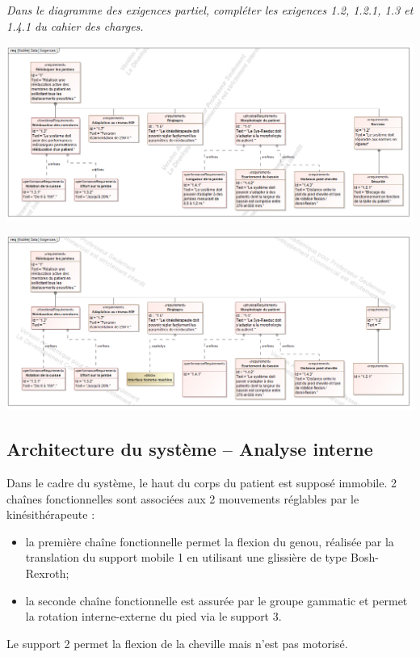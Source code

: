 \documentclass[10pt]{article}
\begin{document}
\subparagraph{}
\textit{Dans le diagramme des exigences partiel, compléter les exigences \textit{1.2}, \textit{1.2.1}, \textit{1.3} et \textit{1.4.1} du cahier des charges.}
\ifprof
\begin{corrige}
\begin{center}
\includegraphics[width=\textwidth]{images/Exigences_Corr}
\end{center}
\end{corrige}
\else
\begin{center}
\includegraphics[width=\textwidth]{images/ExigencesVierges}
\end{center}
\fi

\subsection*{Architecture du système -- Analyse interne}


\ifprof
\else
Dans le cadre du système, le haut du corps du patient est supposé immobile. 2 chaînes fonctionnelles sont associées aux 2 mouvements réglables par le kinésithérapeute :
\begin{itemize}
\item la première chaîne fonctionnelle permet la flexion du genou, réalisée par la translation du support mobile 1 en utilisant une glissière de type Bosh-Rexroth;
\item la seconde chaîne fonctionnelle est assurée par le groupe gammatic et permet la rotation interne-externe du pied via le support 3.
\end{itemize}
Le support 2 permet la flexion de la cheville mais n’est pas motorisé.
\end{document}
